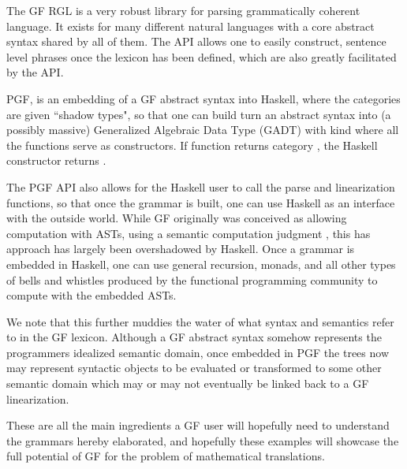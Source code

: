 The GF RGL is a very robust library for parsing grammatically coherent language.
It exists for many different natural languages with a core abstract syntax
shared by all of them. The API allows one to easily construct, sentence level
phrases once the lexicon has been defined, which are also greatly facilitated by
the API. 

PGF, is an embedding of a GF abstract syntax into Haskell, where the categories
are given ``shadow types", so that one can build turn an abstract syntax into (a
possibly massive) Generalized Algebraic Data Type (GADT)  with kind
\codeword{* -> *} where all the functions serve as constructors. If function
 returns category , the Haskell constructor
 returns .

The PGF API also allows for the Haskell user to call the parse and linearization
functions, so that once the grammar is built, one can use Haskell as an
interface with the outside world. While GF originally was conceived as allowing
computation with ASTs, using a semantic computation judgment , this
has approach has largely been overshadowed by Haskell. Once a grammar is
embedded in Haskell, one can use general recursion, monads, and all other types
of bells and whistles produced by the functional programming community to
compute with the embedded ASTs.

We note that this further muddies the water of
what syntax and semantics refer to in the GF lexicon. Although a GF
abstract syntax somehow represents the programmers idealized semantic domain,
once embedded in PGF the trees now may represent syntactic objects to be
evaluated or transformed to some other semantic domain which may or may not
eventually be linked back to a GF linearization.

These are all the main ingredients a GF user will hopefully need to understand
the grammars hereby elaborated, and hopefully these examples will showcase the
full potential of GF for the problem of mathematical translations.



